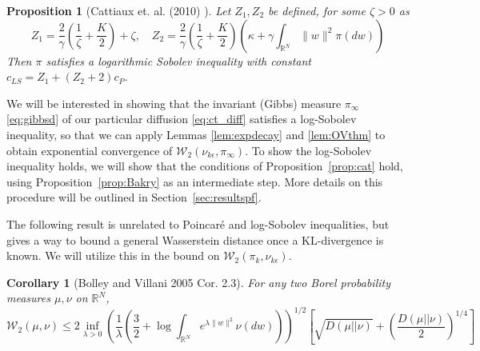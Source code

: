 \documentclass[journal,onecolumn]{IEEEtran}
\newtheorem{proposition}{Proposition}
\newtheorem{corollary}{Corollary}
\newcommand{\step}{\epsilon}
\newcommand{\reals}{\mathbb{R}}
\newcommand{\dimn}{N}
\newcommand{\wass}{\mathcal{W}_2}
\newcommand{\KL}{D}
\newcommand{\gibbs}{\ids_{\infty}}
\newcommand{\dtlaw}{\ids_{k}} %
\newcommand{\ctlaw}{\nu_{k\step}}
\newcommand{\pconst}{c_P}
\newcommand{\LSconst}{c_{LS}}
\newcommand{\ids}{\pi}
\newcommand{\idw}{\gamma}
\newcommand{\ksp}{k,\idw}
\begin{document}
{\begin{proposition}[Cattiaux et. al. (2010) \cite{cattiaux2008note}]
Let $Z_1, Z_2$ be defined, for some $\zeta>0$ as
\begin{equation*}
    Z_1 = \frac{2}{\gamma}\left(\frac{1}{\zeta} + \frac{K}{2} \right) + \zeta, \quad Z_2 = \frac{2}{\gamma}\left(\frac{1}{\zeta} + \frac{K}{2} \right)\left( \kappa + \gamma\int_{\reals^{\dimn}}
    \|w\|^2 \pi(dw)\right)
\end{equation*}
Then $\pi$ satisfies a logarithmic Sobolev inequality with constant $\LSconst = Z_1 + (Z_2 + 2)\pconst$.
\end{proposition}

We will be interested in showing that the invariant (Gibbs) measure $\gibbs$ \eqref{eq:gibbsd} of our particular diffusion \eqref{eq:ct_diff} satisfies a log-Sobolev inequality, so that we can apply Lemmas \ref{lem:expdecay} and \ref{lem:OVthm} to obtain exponential convergence of $\wass(\ctlaw,\gibbs)$. To show the log-Sobolev inequality holds, we will show that the conditions of Proposition~\ref{prop:cat} hold, using Proposition~\ref{prop:Bakry} as an intermediate step. More details on this procedure will be outlined in Section~\ref{sec:resultspf}.

The following result is unrelated to Poincar\'e and log-Sobolev inequalities, but gives a way to bound a general Wasserstein distance once a KL-divergence is known. We will utilize this in the bound on $\wass(\dtlaw,\ctlaw)$.
\begin{corollary}[Bolley and Villani 2005 \cite{bolley2005weighted} Cor. 2.3]
\label{cor:Villani}
For any two Borel probability measures $\mu, \nu$ on $\reals^{\dimn}$, 
\[ \wass(\mu,\nu) \leq 2 \inf_{\lambda > 0}\left(\frac{1}{\lambda}\left(\frac{3}{2} + \log\int_{\reals^{\dimn}}e^{\lambda\|w\|^2}\nu(dw)\right)\right)^{1/2}\left[\sqrt{\KL(\mu || \nu)} + \left(\frac{\KL(\mu || \nu)}{2}\right)^{1/4}\right]\]
\end{corollary}


}
\end{document}
